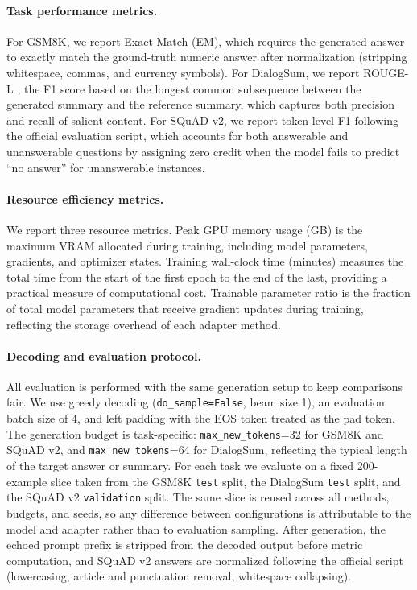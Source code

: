 \documentclass{article}
\begin{document}
\paragraph{Task performance metrics.}
For GSM8K, we report Exact Match (EM), which requires the generated answer to exactly match the ground-truth numeric answer after normalization (stripping whitespace, commas, and currency symbols). For DialogSum, we report ROUGE-L \cite{lin2004rouge}, the F1 score based on the longest common subsequence between the generated summary and the reference summary, which captures both precision and recall of salient content. For SQuAD v2, we report token-level F1 following the official evaluation script, which accounts for both answerable and unanswerable questions by assigning zero credit when the model fails to predict ``no answer'' for unanswerable instances.

\paragraph{Resource efficiency metrics.}
We report three resource metrics. Peak GPU memory usage (GB) is the maximum VRAM allocated during training, including model parameters, gradients, and optimizer states. Training wall-clock time (minutes) measures the total time from the start of the first epoch to the end of the last, providing a practical measure of computational cost. Trainable parameter ratio is the fraction of total model parameters that receive gradient updates during training, reflecting the storage overhead of each adapter method.

\paragraph{Decoding and evaluation protocol.}
All evaluation is performed with the same generation setup to keep comparisons fair. We use greedy decoding (\texttt{do\_sample=False}, beam size 1), an evaluation batch size of 4, and left padding with the EOS token treated as the pad token. The generation budget is task-specific: \texttt{max\_new\_tokens}=32 for GSM8K and SQuAD v2, and \texttt{max\_new\_tokens}=64 for DialogSum, reflecting the typical length of the target answer or summary. For each task we evaluate on a fixed 200-example slice taken from the GSM8K \texttt{test} split, the DialogSum \texttt{test} split, and the SQuAD v2 \texttt{validation} split. The same slice is reused across all methods, budgets, and seeds, so any difference between configurations is attributable to the model and adapter rather than to evaluation sampling. After generation, the echoed prompt prefix is stripped from the decoded output before metric computation, and SQuAD v2 answers are normalized following the official script (lowercasing, article and punctuation removal, whitespace collapsing).
\end{document}

